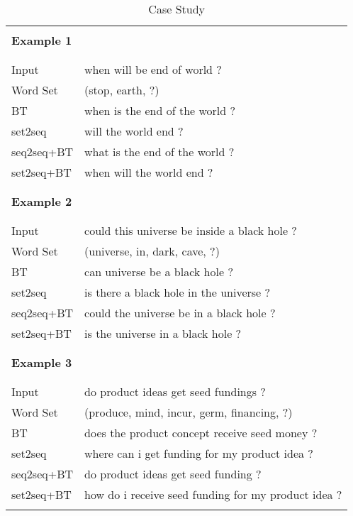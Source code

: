 \begin{table}
\small
\centering
\begin{tabular}{lp{4.6cm}}
\hline 
\\ [-1.8ex]
\textbf{Example 1} & \\
\\ [-1.8ex]
\hline
\\ [-1.8ex]
Input & when will be end of world ? \\
Word Set & (stop, earth, ?) \\
BT & when is the end of the world ? \\
set2seq & will the world end ? \\
seq2seq+BT & what is the end of the world ? \\
set2seq+BT & when will the world end ? \\
\\ [-1.8ex]
\hline
\\ [-1.8ex]
\textbf{Example 2} & \\
\\ [-1.8ex]
\hline
\\ [-1.8ex]
Input & could this universe be inside a black hole ? \\
Word Set & (universe, in, dark, cave, ?) \\
BT & can universe be a black hole ? \\
set2seq & is there a black hole in the universe ? \\
seq2seq+BT & could the universe be in a black hole ? \\
set2seq+BT & is the universe in a black hole ? \\
\\ [-1.8ex]
\hline
\\ [-1.8ex]
\textbf{Example 3} & \\
\\ [-1.8ex]
\hline
\\ [-1.8ex]
Input & do product ideas get seed fundings ? \\
Word Set & (produce, mind, incur, germ, financing, ?) \\
BT & does the product concept receive seed money ? \\
set2seq & where can i get funding for my product idea ? \\
seq2seq+BT & do product ideas get seed funding ? \\
set2seq+BT & how do i receive seed funding for my product idea ? \\
\\ [-1.8ex]
\hline
\end{tabular}
\caption{\label{tab:case} Case Study }
\end{table}
